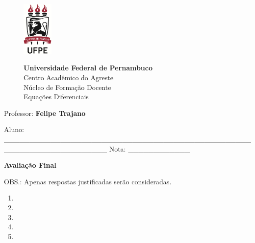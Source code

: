 \documentclass[12pt]{report}
\begin{document}
\thispagestyle{empty}

\begin{figure}[ht]
\hspace{0.5cm}
\begin{minipage}[b]{0.11\linewidth}
\centering
\includegraphics[width=1.5cm]{logoufpe.jpg}
\end{minipage}
\hspace{0.5cm}
\begin{minipage}[b]{0.75\linewidth}
\centering
\large\textbf{Universidade Federal de Pernambuco}\\
Centro Acad\^emico do Agreste	\\
N\'ucleo de Forma\c{c}\~ao Docente\\
Equa\c{c}\~oes Diferenciais
\end{minipage}
\end{figure}
Professor: \textbf{Felipe Trajano}
\vspace{0.2cm}

Aluno: \_\_\_\_\_\_\_\_\_\_\_\_\_\_\_\_\_\_\_\_\_\_\_\_\_\_\_\_\_\_\_\_\_\_\_\_\_\_\_\_\_\_\_\_\_\_\_\_\_\_\_\_\_\_\_\_\_\_\_\_\_\_\_\_\_\_\_\_ Nota: \_\_\_\_\_\_\_\_\_\_\_\_
\vspace{0.2cm}
\begin{center}
\textbf{Avalia\c{c}\~ao Final}
\end{center}

OBS.: Apenas respostas justificadas ser\~ao consideradas.

\vspace{0.2cm}
\normalsize

\begin{enumerate}

\item 


\item 


\item 


\item 


\item 


\end{enumerate}
\end{document}
